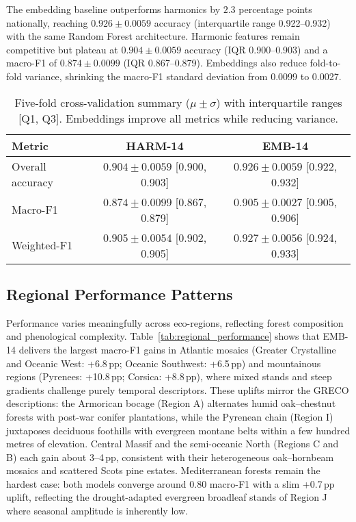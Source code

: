 \documentclass[utf8]{FrontiersinHarvard}
\begin{document}
The embedding baseline outperforms harmonics by \(2.3\) percentage points nationally, reaching \(0.926 \pm 0.0059\) accuracy (interquartile range 0.922–0.932) with the same Random Forest architecture. Harmonic features remain competitive but plateau at \(0.904 \pm 0.0059\) accuracy (IQR 0.900–0.903) and a macro-F1 of \(0.874 \pm 0.0099\) (IQR 0.867–0.879). Embeddings also reduce fold-to-fold variance, shrinking the macro-F1 standard deviation from 0.0099 to 0.0027.

\begin{table}[H]
    \centering
    \small
    \begin{tabular}{lcc}
        \toprule
        \textbf{Metric} & \textbf{HARM-14} & \textbf{EMB-14} \\
        \midrule
        Overall accuracy & \(0.904 \pm 0.0059\) [0.900, 0.903] & \(0.926 \pm 0.0059\) [0.922, 0.932] \\
        Macro-F1 & \(0.874 \pm 0.0099\) [0.867, 0.879] & \(0.905 \pm 0.0027\) [0.905, 0.906] \\
        Weighted-F1 & \(0.905 \pm 0.0054\) [0.902, 0.905] & \(0.927 \pm 0.0056\) [0.924, 0.933] \\
        \bottomrule
    \end{tabular}
    \caption{Five-fold cross-validation summary (\( \mu \pm \sigma\)) with interquartile ranges [Q1, Q3]. Embeddings improve all metrics while reducing variance.}
    \label{tab:cv_summary}
\end{table}

\subsection{Regional Performance Patterns}

Performance varies meaningfully across eco-regions, reflecting forest composition and phenological complexity. Table~\ref{tab:regional_performance} shows that EMB-14 delivers the largest macro-F1 gains in Atlantic mosaics (Greater Crystalline and Oceanic West: +6.8\,pp; Oceanic Southwest: +6.5\,pp) and mountainous regions (Pyrenees: +10.8\,pp; Corsica: +8.8\,pp), where mixed stands and steep gradients challenge purely temporal descriptors. These uplifts mirror the GRECO descriptions: the Armorican bocage (Region A) alternates humid oak–chestnut forests with post-war conifer plantations, while the Pyrenean chain (Region I) juxtaposes deciduous foothills with evergreen montane belts within a few hundred metres of elevation. Central Massif and the semi-oceanic North (Regions C and B) each gain about 3–4\,pp, consistent with their heterogeneous oak–hornbeam mosaics and scattered Scots pine estates. Mediterranean forests remain the hardest case: both models converge around \(0.80\) macro-F1 with a slim +0.7\,pp uplift, reflecting the drought-adapted evergreen broadleaf stands of Region J where seasonal amplitude is inherently low.
\end{document}

